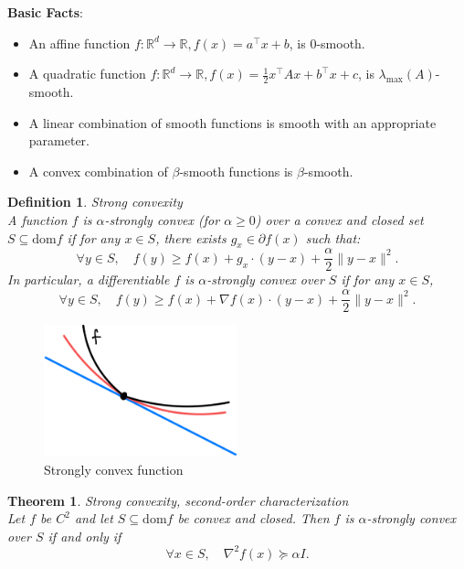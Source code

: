 \documentclass[11pt]{book} %
\newtheorem{theorem}{Theorem}[section]
\newtheorem{definition}{Definition}[section]
\begin{document}
\textbf{Basic Facts}:
\begin{itemize}
    \item An affine function \( f : \mathbb{R}^d \rightarrow \mathbb{R}, f(x) = a^\top x + b \), is 0-smooth.
    \item A quadratic function \( f : \mathbb{R}^d \rightarrow \mathbb{R}, f(x) = \frac{1}{2} x^\top A x + b^\top x + c \), is \( \lambda_{\text{max}}(A) \)-smooth.
    \item A linear combination of smooth functions is smooth with an appropriate parameter.
    \item A convex combination of \(\beta\)-smooth functions is \(\beta\)-smooth.
\end{itemize}


\begin{definition} {Strong convexity} \\
A function \( f \) is \(\alpha\)-strongly convex (for \(\alpha \geq 0\)) over a convex and closed set \( S \subseteq \text{dom} f \) if for any \( x \in S \), there exists \( g_x \in \partial f(x) \) such that:
\[
\forall y \in S, \quad f(y) \geq f(x) + g_x \cdot (y - x) + \frac{\alpha}{2} \|y - x\|^2.
\]
In particular, a differentiable \( f \) is \(\alpha\)-strongly convex over \( S \) if for any \( x \in S \),
\[
\forall y \in S, \quad f(y) \geq f(x) + \nabla f(x) \cdot (y - x) + \frac{\alpha}{2} \|y - x\|^2.
\]
\end{definition}

\begin{figure}[H]
    \centering
    \includegraphics[width=0.5\textwidth]{Figs/strongly_convex.png}
    \caption{Strongly convex function}
\end{figure}

\begin{theorem} { Strong convexity, second-order characterization}\\
Let \( f \) be \( C^2 \) and let \( S \subseteq \text{dom} f \) be convex and closed. Then \( f \) is \(\alpha\)-strongly convex over \( S \) if and only if
\[
\forall x \in S, \quad \nabla^2 f(x) \succeq \alpha I.
\]
\end{theorem}
\end{document}
